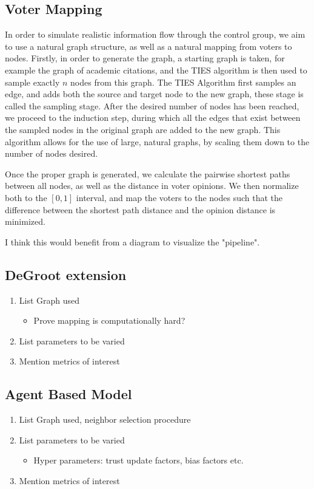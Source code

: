\subsection{Voter Mapping}
In order to simulate realistic information flow through the control group, we aim to use a natural graph structure, as well as a natural mapping from voters to nodes. Firstly, in order to generate the graph, a starting graph is taken, for example the graph of academic citations, and the TIES \cite{ahmedNetworkSamplingStatic2013} algorithm is then used to sample exactly $n$ nodes from this graph. The TIES Algorithm first samples an edge, and adds both the source and target node to the new graph, these stage is called the sampling stage. After the desired number of nodes has been reached, we proceed to the induction step, during which all the edges that exist between the sampled nodes in the original graph are added to the new graph. This algorithm allows for the use of large, natural graphs, by scaling them down to the number of nodes desired.

Once the proper graph is generated, we calculate the pairwise shortest paths between all nodes, as well as the distance in voter opinions. We then normalize both to the $[0,1]$ interval, and map the voters to the nodes such that the difference between the shortest path distance and the opinion distance is minimized.

\textcolor{Bittersweet}{I think this would benefit from a diagram to visualize the "pipeline"}.

\subsection{DeGroot extension}
\begin{enumerate}
	\item List Graph used
		\begin{itemize}
			\item Prove mapping is computationally hard?
		\end{itemize}
	\item List parameters to be varied
	\item Mention metrics of interest

\end{enumerate}
\subsection{Agent Based Model}
\begin{enumerate}
	\item List Graph used, neighbor selection procedure
	\item List parameters to be varied
		\begin{itemize}
			\item Hyper parameters: trust update factors, bias factors etc.
		\end{itemize}
	\item Mention metrics of interest
	\end{enumerate}
